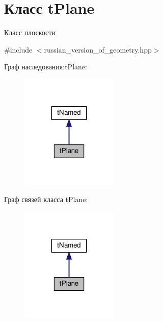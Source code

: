\hypertarget{classtPlane}{}\section{Класс t\+Plane}
\label{classtPlane}


Класс плоскости  




{\ttfamily \#include $<$russian\+\_\+version\+\_\+of\+\_\+geometry.\+hpp$>$}



Граф наследования\+:t\+Plane\+:\nopagebreak
\begin{figure}[H]
\begin{center}
\leavevmode
\includegraphics[width=131pt]{classtPlane__inherit__graph}
\end{center}
\end{figure}


Граф связей класса t\+Plane\+:\nopagebreak
\begin{figure}[H]
\begin{center}
\leavevmode
\includegraphics[width=131pt]{classtPlane__coll__graph}
\end{center}
\end{figure}
